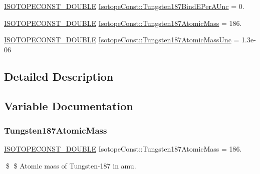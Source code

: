 \begin{DoxyCompactItemize}
\mbox{\hyperlink{group___isotope_const-_macros_ga8f45a7272ce02c0b4c65c44636ed719a}{I\+S\+O\+T\+O\+P\+E\+C\+O\+N\+S\+T\+\_\+\+D\+O\+U\+B\+LE}} \mbox{\hyperlink{group___isotope_const-_tungsten-_w187_gaf45d0eb5878b064cc596cd799ff83d11}{Isotope\+Const\+::\+Tungsten187\+Bind\+E\+Per\+A\+Unc}} = 0.
\item 
\mbox{\hyperlink{group___isotope_const-_macros_ga8f45a7272ce02c0b4c65c44636ed719a}{I\+S\+O\+T\+O\+P\+E\+C\+O\+N\+S\+T\+\_\+\+D\+O\+U\+B\+LE}} \mbox{\hyperlink{group___isotope_const-_tungsten-_w187_gadcbf597c9f8529c65e2cf09cb67a3543}{Isotope\+Const\+::\+Tungsten187\+Atomic\+Mass}} = 186.
\item 
\mbox{\hyperlink{group___isotope_const-_macros_ga8f45a7272ce02c0b4c65c44636ed719a}{I\+S\+O\+T\+O\+P\+E\+C\+O\+N\+S\+T\+\_\+\+D\+O\+U\+B\+LE}} \mbox{\hyperlink{group___isotope_const-_tungsten-_w187_gab994dc77c51733c25ca829c2813199ff}{Isotope\+Const\+::\+Tungsten187\+Atomic\+Mass\+Unc}} = 1.\+3e-\/06
\end{DoxyCompactItemize}


\subsection{Detailed Description}


\subsection{Variable Documentation}
\mbox{\label{group___isotope_const-_tungsten-_w187_gadcbf597c9f8529c65e2cf09cb67a3543}} 
\subsubsection{\texorpdfstring{Tungsten187\+Atomic\+Mass}{Tungsten187AtomicMass}}
{\footnotesize\ttfamily \mbox{\hyperlink{group___isotope_const-_macros_ga8f45a7272ce02c0b4c65c44636ed719a}{I\+S\+O\+T\+O\+P\+E\+C\+O\+N\+S\+T\+\_\+\+D\+O\+U\+B\+LE}} Isotope\+Const\+::\+Tungsten187\+Atomic\+Mass = 186.}

\$ \$ Atomic mass of Tungsten-\/187 in amu. \mbox{\label{group___isotope_const-_tungsten-_w187_gab994dc77c51733c25ca829c2813199ff}} 
